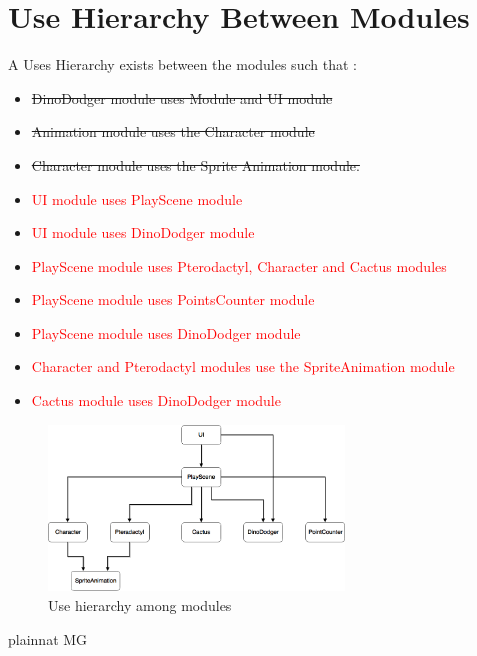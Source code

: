 \documentclass[12pt, titlepage]{article}
\begin{document}
\section{Use Hierarchy Between Modules} \label{SecUse}
A Uses Hierarchy exists between the modules such that :
\begin{itemize}
\item {\sout{DinoDodger module uses  Module and UI module}}
\item {\sout{Animation module uses the Character module}}
\item {\sout{Character module uses the Sprite Animation module.}} 
\end{itemize}  

\begin{itemize}
\item{\textcolor{red}{ UI module uses PlayScene module}}
\item{\textcolor{red}{UI module uses DinoDodger module}} 
\item{\textcolor{red}{PlayScene module uses Pterodactyl, Character and Cactus modules}}
\item{\textcolor{red}{PlayScene module uses PointsCounter module}}
\item{\textcolor{red}{PlayScene module uses DinoDodger module}}
\item{\textcolor{red}{Character and Pterodactyl modules use the SpriteAnimation module}}
\item{\textcolor{red}{Cactus module uses DinoDodger module}}
\end{itemize}

\begin{figure}[H]
\centering
\includegraphics[width=0.7\textwidth]{USES.png}

\caption{Use hierarchy among modules}
\label{FigUH}
\end{figure}

 {plainnat}
 {MG}
\end{document}
